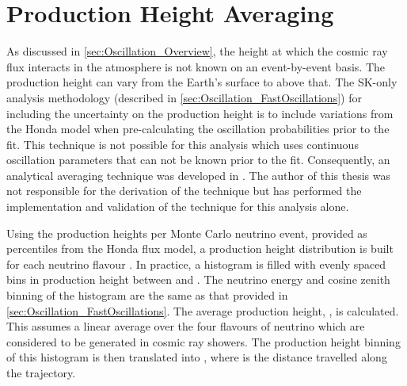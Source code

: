 \clearpage

\section{Production Height Averaging}
\label{sec:Oscillation_ProdHAvergaing}

As discussed in \autoref{sec:Oscillation_Overview}, the height at which the cosmic ray flux interacts in the atmosphere is not known on an event-by-event basis. The production height can vary from the Earth's surface to  above that. The SK-only analysis methodology (described in \autoref{sec:Oscillation_FastOscillations}) for including the uncertainty on the production height is to include variations from the Honda model when pre-calculating the oscillation probabilities prior to the fit. This technique is not possible for this analysis which uses continuous oscillation parameters that can not be known prior to the fit. Consequently, an analytical averaging technique was developed in \cite{t2k_tn_425}. The author of this thesis was not responsible for the derivation of the technique but has performed the implementation and validation of the technique for this analysis alone.

Using the  production heights per Monte Carlo neutrino event, provided as  percentiles from the Honda flux model, a production height distribution  is built for each neutrino flavour . In practice, a histogram is filled with  evenly spaced bins in production height  between  and . The neutrino energy and cosine zenith binning of the histogram are the same as that provided in \autoref{sec:Oscillation_FastOscillations}. The average production height, , is calculated. This assumes a linear average over the four flavours of neutrino which are considered to be generated in cosmic ray showers. The production height binning of this histogram is then translated into , where  is the distance travelled along the trajectory.

